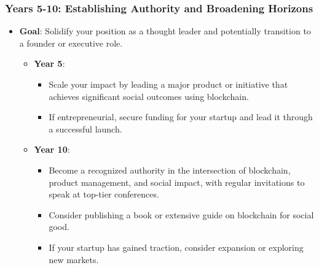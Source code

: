 \bigskip

\hypertarget{year-4-5-establishing-authority-and-broadening-horizons}{%
\subsubsection*{\texorpdfstring{\textbf{Years 5-10: Establishing Authority
and Broadening
Horizons}}{Years 5-10: Establishing Authority and Broadening Horizons}}\label{year-4-5-establishing-authority-and-broadening-horizons}}

\begin{itemize}
\tightlist
\item
  \textbf{Goal}: Solidify your position as a thought leader and
  potentially transition to a founder or executive role.

  \begin{itemize}
  \tightlist
  \item
    \textbf{Year 5}:

    \begin{itemize}
    \tightlist
    \item
      Scale your impact by leading a major product or initiative that
      achieves significant social outcomes using blockchain.
    \item
      If entrepreneurial, secure funding for your startup and lead it
      through a successful launch.
    \end{itemize}
  \item
    \textbf{Year 10}:

    \begin{itemize}
    \tightlist
    \item
      Become a recognized authority in the intersection of blockchain,
      product management, and social impact, with regular invitations to
      speak at top-tier conferences.
    \item
      Consider publishing a book or extensive guide on blockchain for
      social good.
    \item
      If your startup has gained traction, consider expansion or
      exploring new markets.
    \end{itemize}
  \end{itemize}
\end{itemize}


